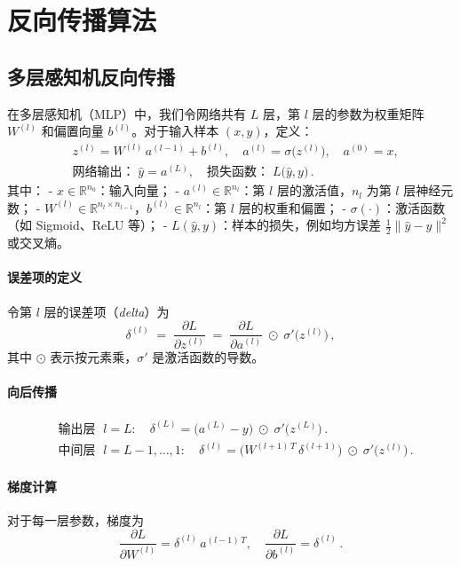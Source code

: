 
\newpage
\appendix

\section{反向传播算法}

\subsection{多层感知机反向传播}\label{sec:mlpbp}

在多层感知机（MLP）中，我们令网络共有 $L$ 层，第 $l$ 层的参数为权重矩阵 $W^{(l)}$ 和偏置向量 $b^{(l)}$。对于输入样本 $(x,y)$，定义：
\[
\begin{aligned}
&z^{(l)} = W^{(l)}\,a^{(l-1)} + b^{(l)},\quad
a^{(l)} = \sigma\bigl(z^{(l)}\bigr),\quad
a^{(0)} = x,\\
&\text{网络输出：}\;\hat y = a^{(L)},\quad
\text{损失函数：}\;L\bigl(\hat y,y\bigr)\,.
\end{aligned}
\]
其中：
- $x\in\mathbb R^{n_0}$：输入向量；
- $a^{(l)}\in\mathbb R^{n_l}$：第 $l$ 层的激活值，$n_l$ 为第 $l$ 层神经元数；
- $W^{(l)}\in\mathbb R^{n_l\times n_{l-1}}$，$b^{(l)}\in\mathbb R^{n_l}$：第 $l$ 层的权重和偏置；
- $\sigma(\cdot)$：激活函数（如 Sigmoid、ReLU 等）；
- $L(\hat y,y)$：样本的损失，例如均方误差 $\tfrac12\|\hat y-y\|^2$ 或交叉熵。

\paragraph{误差项的定义}  
令第 $l$ 层的误差项（\emph{delta}）为
\[
\delta^{(l)} \;=\;\frac{\partial L}{\partial z^{(l)}}
\;=\;\frac{\partial L}{\partial a^{(l)}}\;\odot\;\sigma'\bigl(z^{(l)}\bigr)\,,
\]
其中 $\odot$ 表示按元素乘，$\sigma'$ 是激活函数的导数。

\paragraph{向后传播}  
\begin{align}
&\text{输出层 }\;l=L:\quad
\delta^{(L)} = \bigl(a^{(L)} - y\bigr)\;\odot\;\sigma'\bigl(z^{(L)}\bigr)\,.\\
&\text{中间层 }\;l=L-1,\dots,1:\quad
\delta^{(l)} = \bigl(W^{(l+1)\,T}\,\delta^{(l+1)}\bigr)\;\odot\;\sigma'\bigl(z^{(l)}\bigr)\,.
\end{align}

\paragraph{梯度计算}  
对于每一层参数，梯度为
\[
\frac{\partial L}{\partial W^{(l)}} = \delta^{(l)}\,a^{(l-1)\,T},\quad
\frac{\partial L}{\partial b^{(l)}} = \delta^{(l)}\,.
\]

